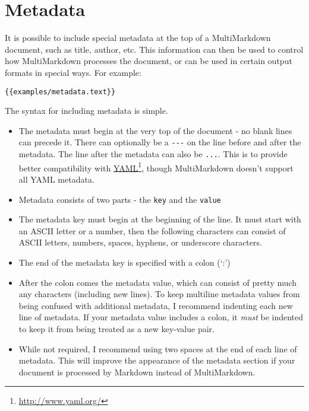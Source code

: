 \section{Metadata }
\label{metadata}

It is possible to include special metadata at the top of a MultiMarkdown
document, such as title, author, etc. This information can then be used to
control how MultiMarkdown processes the document, or can be used in certain
output formats in special ways. For example:

\begin{verbatim}
{{examples/metadata.text}}
\end{verbatim}

The syntax for including metadata is simple.

\begin{itemize}
\item The metadata must begin at the very top of the document - no blank lines can precede it. There can optionally be a \texttt{-{}-{}-} on the line before and after the metadata. The line after the metadata can also be \texttt{...}. This is to provide better compatibility with \href{http://www.yaml.org/}{YAML}\footnote{\href{http://www.yaml.org/}{http:\slash \slash www.yaml.org\slash }}, though MultiMarkdown doesn't support all YAML metadata.

\item Metadata consists of two parts - the \texttt{key} and the \texttt{value}

\item The metadata key must begin at the beginning of the line. It must start with an ASCII letter or a number, then the following characters can consist of ASCII letters, numbers, spaces, hyphens, or underscore characters.

\item The end of the metadata key is specified with a colon (`:')

\item After the colon comes the metadata value, which can consist of pretty much any characters (including new lines). To keep multiline metadata values from being confused with additional metadata, I recommend indenting each new line of metadata. If your metadata value includes a colon, it \emph{must} be indented to keep it from being treated as a new key-value pair.

\item While not required, I recommend using two spaces at the end of each line of metadata. This will improve the appearance of the metadata section if your document is processed by Markdown instead of MultiMarkdown.


\end{itemize}
